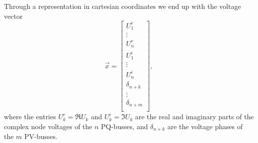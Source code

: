 Through a representation in cartesian coordinates we end up with the voltage vector
\begin{equation}
	\vec x = 
	\begin{bmatrix}
		U_1^r \\
		\vdots \\
		U_n^r \\
		U_1^i \\
		\vdots \\
		U_n^i \\
		\delta_{n+k} \\
		\vdots \\
		\delta_{n+m} \\
	\end{bmatrix},
\end{equation}
where the entries $U_k^r = \Re{U_k}$ and $U_k^i = \Im{U_k}$ are the real and imaginary parts of the complex node voltages of the $n$ PQ-busses, and $\delta_{n+k}$ are the voltage phases of the $m$ PV-busses.

